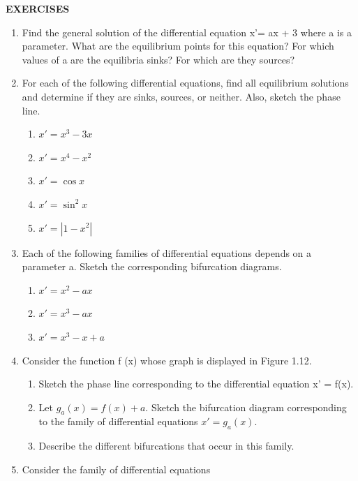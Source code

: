 \documentclass[12pt]{article}
\begin{document}
\hfill

\textbf{EXERCISES}

\hfill

\begin{enumerate}
\item Find the general solution of the differential equation x'= ax + 3 where a is a parameter. What are the equilibrium points for this equation? For which values of a are the equilibria sinks? For which are they sources?

\item For each of the following differential equations, find all equilibrium solutions and determine if they are sinks, sources, or neither. Also, sketch the phase line.

\begin{enumerate}
\item $x' = x^3 - 3x$
\item $x' = x^4 - x^2$
\item $x' = \cos x$
\item $x' = \sin^2 x$
\item $x' = |1 - x^2|$
\end{enumerate}

\item Each of the following families of differential equations depends on a parameter a. Sketch the corresponding bifurcation diagrams.

\begin{enumerate}
\item $x' = x^2 - ax$
\item $x' = x^3 - ax$
\item $x' = x^3 - x + a$
\end{enumerate}

\item Consider the function f (x) whose graph is displayed in Figure 1.12.

\begin{enumerate}
\item Sketch the phase line corresponding to the differential equation x' = f(x).
\item Let $g_a(x) = f(x)+a$. Sketch the bifurcation diagram corresponding to the family of differential equations $x' = g_a(x)$.

\item Describe the different bifurcations that occur in this family.
\end{enumerate}

\item Consider the family of differential equations


\end{enumerate}
\end{document}
